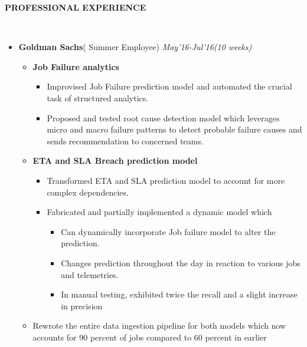 \documentclass[a4paper,9pt]{extarticle}
\newcommand{\lsep}{-0.5cm}
\newcommand{\resheading}[1]{{\small \colorbox{mygrey}{\begin{minipage}{0.975\textwidth}{\textbf{#1 \vphantom{p\^{E}}}}\end{minipage}}}}
\begin{document}
        \resheading{\textbf{PROFESSIONAL EXPERIENCE} }\\[\lsep]
        \vspace{1.2mm}\begin{itemize} \itemsep -2pt
        \item \textbf{Goldman Sachs}( Summer Employee) \hfill
          \textit{May'16-Jul'16(10 weeks)}
          \vspace{-2mm}\begin{itemize} \itemsep -1pt
          \item \textbf{Job Failure analytics}
          \vspace{-1.2mm}\begin{itemize} \itemsep -1pt
            \item Improvised Job Failure prediction model and automated the
              crucial task of structured analytics.
            \item Proposed and tested root cause detection model which leverages
              micro and macro failure patterns to detect probable failure causes
              and sends recommendation to concerned teams.
            \end{itemize}
          \item \textbf{ETA and SLA Breach prediction model}
          \vspace{-1mm}\begin{itemize} \itemsep -2pt
            \item Transformed ETA and SLA prediction model to account for more
              complex dependencies.
            \item Fabricated and partially implemented a dynamic model which
              \begin{itemize}
              \item Can dynamically incorporate Job failure model to alter the
                prediction.
              \item Changes prediction throughout the day in reaction to various
                jobs and telemetries.
              \item In manual testing, exhibited twice the recall and a slight
                increase in precision
              \end{itemize}
            \end{itemize}
          \item Rewrote the entire data ingestion pipeline for both models which now
            accounts for 90 percent of jobs compared to 60 percent in earlier

\end{itemize}
\end{itemize}
\end{document}
